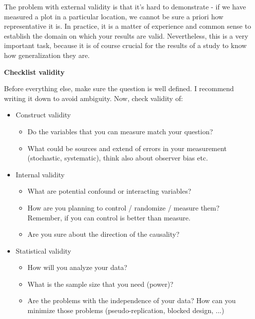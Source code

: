 \documentclass{tufte-book}
\begin{document}
The problem with external validity is that it's hard to demonstrate - if we have measured a plot in a particular location, we cannot be sure a priori how representative it is. In practice, it is a matter of experience and common sense to establish the domain on which your results are valid. Nevertheless, this is a very important task, because it is of course crucial for the results of a study to know how generalization they are. 

\vspace{1cm}

\begin{mdframed}
    
\textbf{Checklist validity}%

Before everything else, make sure the question is well defined. I recommend writing it down to avoid ambiguity. Now, check validity of:

    \begin{itemize}
      \item Construct validity
      \begin{itemize}
        \item Do the variables that you can measure match your question?
        \item What could be sources and extend of errors in your measurement (stochastic, systematic), think also about observer bias etc.
      \end{itemize}
      
      \item Internal validity
      \begin{itemize}
        \item What are potential confound or interacting variables?
        \item How are you planning to control / randomize / measure them? Remember, if you can control is better than measure.
        \item Are you sure about the direction of the causality?
      \end{itemize}     
       
      \item Statistical validity
      \begin{itemize}
        \item How will you analyze your data?
        \item What is the sample size that you need (power)?
        \item Are the problems with the independence of your data? How can you minimize those problems (pseudo-replication, blocked design, ...)
      \end{itemize} 
         

\end{itemize}
\end{mdframed}
\end{document}
